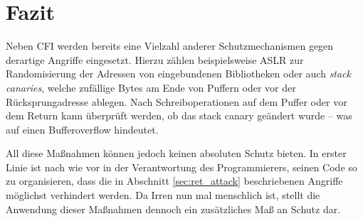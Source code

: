 \documentclass[12pt,%
               oneside,
               a4paper]{uiothesis}
\begin{document}
\section{Fazit}
Neben CFI werden bereits eine Vielzahl anderer Schutzmechanismen gegen derartige Angriffe eingesetzt. Hierzu zählen beispielsweise ASLR zur Randomisierung der Adressen von eingebundenen Bibliotheken oder auch \emph{stack canaries}, welche zufällige Bytes am Ende von Puffern oder vor der Rücksprungadresse ablegen. Nach Schreiboperationen auf dem Puffer oder vor dem Return kann überprüft werden, ob das stack canary geändert wurde -- was auf einen Bufferoverflow hindeutet.

All diese Maßnahmen können jedoch keinen absoluten Schutz bieten. In erster Linie ist nach wie vor in der Verantwortung des Programmierers, seinen Code so zu organisieren, dass die in Abschnitt \ref{sec:ret_attack} beschriebenen Angriffe möglichst verhindert werden. Da Irren nun mal menschlich ist, stellt die Anwendung dieser Maßnahmen dennoch ein zusätzliches Maß an Schutz dar.

\printbibliography
\end{document}
